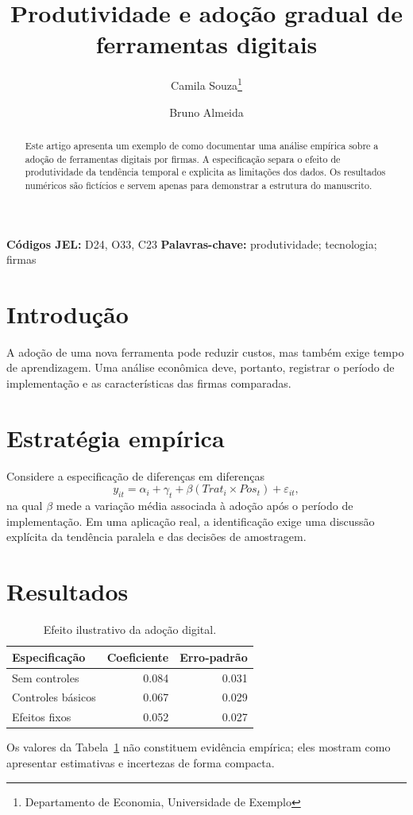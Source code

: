 \documentclass[11pt,a4paper]{article}
\title{Produtividade e adoção gradual de ferramentas digitais}
\author{Camila Souza\thanks{Departamento de Economia, Universidade de Exemplo}\and
  Bruno Almeida}
\date{}
\begin{document}
\maketitle
\begin{center}
\small\textbf{Códigos JEL:} D24, O33, C23\quad
\textbf{Palavras-chave:} produtividade; tecnologia; firmas
\end{center}

\begin{abstract}
Este artigo apresenta um exemplo de como documentar uma análise empírica sobre
a adoção de ferramentas digitais por firmas. A especificação separa o efeito
de produtividade da tendência temporal e explicita as limitações dos dados.
Os resultados numéricos são fictícios e servem apenas para demonstrar a
estrutura do manuscrito.
\end{abstract}

\section{Introdução}
A adoção de uma nova ferramenta pode reduzir custos, mas também exige tempo de
aprendizagem. Uma análise econômica deve, portanto, registrar o período de
implementação e as características das firmas comparadas.

\section{Estratégia empírica}
Considere a especificação de diferenças em diferenças
\begin{equation}
 y_{it}=\alpha_i+\gamma_t+\beta(Trat_i\times Pos_t)+\varepsilon_{it},
 \label{eq:did}
\end{equation}
na qual $\beta$ mede a variação média associada à adoção após o período de
implementação. Em uma aplicação real, a identificação exige uma discussão
explícita da tendência paralela e das decisões de amostragem.

\section{Resultados}
\begin{table}[ht]
\centering
\caption{Efeito ilustrativo da adoção digital.}
\label{tab:effect}
\begin{tabular}{lrr}
\toprule
Especificação & Coeficiente & Erro-padrão\\
\midrule
Sem controles & 0.084 & 0.031\\
Controles básicos & 0.067 & 0.029\\
Efeitos fixos & 0.052 & 0.027\\
\bottomrule
\end{tabular}
\end{table}
Os valores da Tabela~\ref{tab:effect} não constituem evidência empírica; eles
mostram como apresentar estimativas e incertezas de forma compacta.
\end{document}
